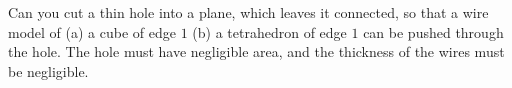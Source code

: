 Can you cut a thin hole into a plane, which leaves it connected, so that a wire model of (a) a cube of edge $1$ (b) a tetrahedron of edge $1$ can be pushed through the hole. The hole must have negligible area, and the thickness of the wires must be negligible.
